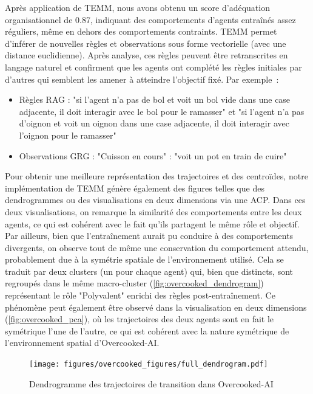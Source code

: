 Après application de TEMM, nous avons obtenu un score d'adéquation organisationnel de 0.87, indiquant des comportements d'agents entraînés assez réguliers, même en dehors des comportements contraints. TEMM permet d'inférer de nouvelles règles et observations sous forme vectorielle (avec une distance euclidienne). Après analyse, ces règles peuvent être retranscrites en langage naturel et confirment que les agents ont complété les règles initiales par d'autres qui semblent les amener à atteindre l'objectif fixé. Par exemple~:
%
\begin{itemize}
  \item Règles RAG : "si l'agent n'a pas de bol et voit un bol vide dans une case adjacente, il doit interagir avec le bol pour le ramasser" et "si l'agent n'a pas d'oignon et voit un oignon dans une case adjacente, il doit interagir avec l'oignon pour le ramasser"
  \item Observations GRG : "Cuisson en cours" : "voit un pot en train de cuire"
\end{itemize}

Pour obtenir une meilleure représentation des trajectoires et des centroïdes, notre implémentation de TEMM génère également des figures telles que des dendrogrammes ou des visualisations en deux dimensions via une ACP. Dans ces deux visualisations, on remarque la similarité des comportements entre les deux agents, ce qui est cohérent avec le fait qu'ils partagent le même rôle et objectif. Par ailleurs, bien que l'entraînement aurait pu conduire à des comportements divergents, on observe tout de même une conservation du comportement attendu, probablement due à la symétrie spatiale de l'environnement utilisé. Cela se traduit par deux clusters (un pour chaque agent) qui, bien que distincts, sont regroupés dans le même macro-cluster (\autoref{fig:overcooked_dendrogram}) représentant le rôle "Polyvalent" enrichi des règles post-entraînement. Ce phénomène peut également être observé dans la visualisation en deux dimensions (\autoref{fig:overcooked_pca}), où les trajectoires des deux agents sont en fait le symétrique l'une de l'autre, ce qui est cohérent avec la nature symétrique de l'environnement spatial d'Overcooked-AI.

\begin{figure}[h!]
  \centering
  \texttt{[image: figures/overcooked\_figures/full\_dendrogram.pdf]}
  \caption{Dendrogramme des trajectoires de transition dans Overcooked-AI}
  \label{fig:overcooked_dendrogram}
\end{figure}

